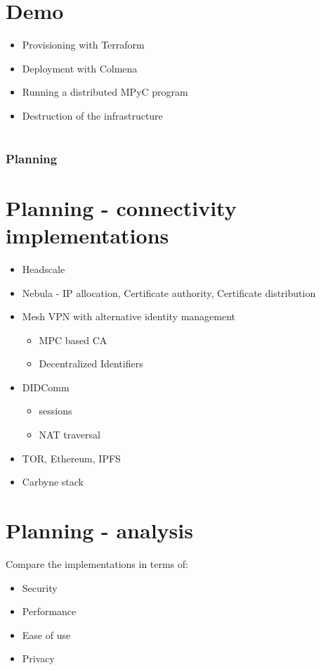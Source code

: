 \hypertarget{demo}{%
\part{Demo}\label{demo}}

\begin{itemize}
\tightlist
\item
  Provisioning with Terraform
\item
  Deployment with Colmena
\item
  Running a distributed MPyC program
\item
  Destruction of the infrastructure
\end{itemize}

\hypertarget{section}{%
\part{}\label{section}}

\section{Planning}

\hypertarget{planning---connectivity-implementations}{%
\part{Planning - connectivity
implementations}\label{planning---connectivity-implementations}}

\begin{itemize}
\tightlist
\item
  Headscale
\item
  Nebula - IP allocation, Certificate authority, Certificate
  distribution
\item
  Mesh VPN with alternative identity management

  \begin{itemize}
  \tightlist
  \item
    MPC based CA
  \item
    Decentralized Identifiers
  \end{itemize}
\item
  DIDComm

  \begin{itemize}
  \tightlist
  \item
    sessions
  \item
    NAT traversal
  \end{itemize}
\item
  TOR, Ethereum, IPFS
\item
  Carbyne stack
\end{itemize}

\hypertarget{planning---analysis}{%
\part{Planning - analysis}\label{planning---analysis}}

Compare the implementations in terms of:

\begin{itemize}
\tightlist
\item
  Security
\item
  Performance
\item
  Ease of use
\item
  Privacy
\end{itemize}
